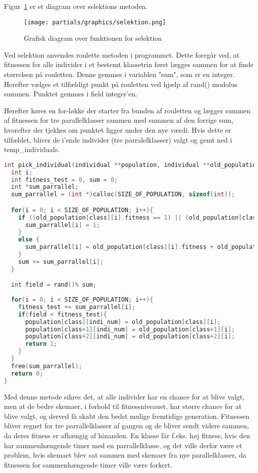 Figur~\ref{fig:diagramselektion} er et diagram over selektions metoden.
\begin{figure}[!h]
\texttt{[image: partials/graphics/selektion.png]}
\caption{Grafisk diagram over funktionen for selektion}
\label{fig:diagramselektion}
\end{figure}

Ved selektion anvendes roulette metoden i programmet. Dette foregår ved, at fitnessen for alle individer i et bestemt klassetrin først lægges sammen for at finde størrelsen på rouletten. Denne gemmes i variablen "sum", som er en integer. Herefter vælges et tilfældigt punkt på rouletten ved hjælp af rand() modolus summen. Punktet gemmes i field integer'en.

Herefter køres en for-løkke der starter fra bunden af rouletten og lægger summen af fitnessen for tre parallelklasser sammen med summen af den forrige sum, hvorefter der tjekkes om punktet ligger under den nye værdi. Hvis dette er tilfældet, bliver de i'ende individer (tre parralelklasser) valgt og gemt ned i temp\_individuals.  

\begin{lstlisting}[language = c]
int pick_individual(individual **population, individual **old_population, int class, int indi_num){
  int i;
  int fitness_test = 0, sum = 0;
  int *sum_parrallel;
  sum_parrallel = (int *)calloc(SIZE_OF_POPULATION, sizeof(int));

  for(i = 0; i < SIZE_OF_POPULATION; i++){
    if ((old_population[class][i].fitness == 1) || (old_population[class+1][i].fitness == 1) || (old_population[class+2][i].fitness == 1)){
      sum_parrallel[i] = 1;
    }
    else {
      sum_parrallel[i] = old_population[class][i].fitness + old_population[class+1][i].fitness + old_population[class+2][i].fitness;
    }
    sum += sum_parrallel[i];
  }

  int field = rand()% sum;
  
  for(i = 0; i < SIZE_OF_POPULATION; i++){
    fitness_test += sum_parrallel[i];
    if(field < fitness_test){
      population[class][indi_num] = old_population[class][i];
      population[class+1][indi_num] = old_population[class+1][i];
      population[class+2][indi_num] = old_population[class+2][i];
      return 1;
    }
  }
  free(sum_parrallel); 
  return 0;
}
\end{lstlisting}

Med denne metode sikres det, at alle individer har en chance for at blive valgt, men at de bedre skemaer, i forhold til fitnessniveauet, har større chance for at blive valgt, og derved få skabt den bedst mulige fremtidige generation. Fitnessen bliver regnet for tre parrallelklasser af gangen og de bliver sendt videre sammen, da deres fitness er afhængig af hinanden. En klasse får f.eks. høj fitness, hvis den har sammenhængende timer med en parrallelklasse, og det ville derfor være et problem, hvis skemaet blev sat sammen med skemaer fra nye parallelklasser, da fitnessen for sammenhængende timer ville være forkert.